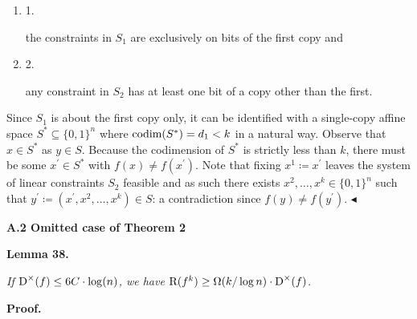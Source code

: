 \documentclass[10pt,a4paper]{article}
\begin{document}
\begin{enumerate}


\item[] 
1. 


the constraints in $S_{1}$ are exclusively on bits of the first copy and\par





\item[] 
2. 


any constraint in $S_{2}$ has at least one bit of a copy other than the first.\par





\end{enumerate}


Since $S_{1}$ is about the first copy only, it can be identified with a single-copy affine space $S^{*}\subseteq\{0,1\}^{n}$ where $\textup{codim}(S^{*})=d_{1}<k$ in a natural way. Observe that $x\in S^{*}$ as $y\in S$. Because the codimension of $S^{*}$ is strictly less than $k$, there must be some $x^{\prime}\in S^{*}$ with $f(x)\neq f(x^{\prime})$. Note that fixing $x^{1}\coloneqq x^{\prime}$ leaves the system of linear constraints $S_{2}$ feasible and as such there exists $x^{2},\dots,x^{k}\in\{0,1\}^{n}$ such that $y^{\prime}\coloneqq(x^{\prime},x^{2},\dots,x^{k})\in S$: a contradiction since $f(y)\neq f(y^{\prime})$.
$\blacktriangleleft$\par






\par\medskip\noindent\textbf{
A.2 Omitted case of Theorem 2
}\par





\par\medskip\noindent\textbf{
\textbf{Lemma 38}\textbf{.}
}\par



\emph{If ${\textup{D}}^{\times}(f)\leq 6C\cdot\log(n)$, we have ${\textup{R}}(f^{k})\geq\Omega(k/\log n)\cdot{\textup{D}}^{\times}(f)$.}\par






\par\medskip\noindent\textbf{Proof.}\par
\end{document}
